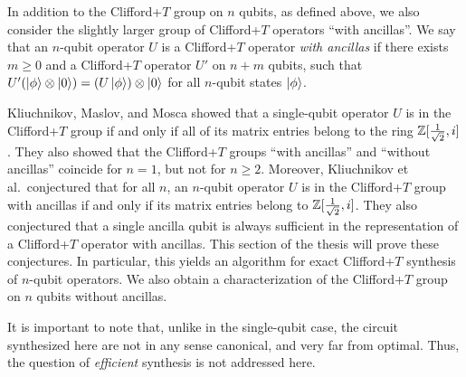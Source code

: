 In addition to the Clifford+$T$ group on $n$ qubits, as defined above, we also consider the
slightly larger group of Clifford+$T$ operators ``with ancillas''. We say that an $n$-qubit
operator $U$ is a Clifford+$T$ operator {\em with ancillas} if there exists $m\geq 0$ and a
Clifford+$T$ operator $U'$ on $n+m$ qubits, such that $U'(\left\vert{\phi}\right\rangle\otimes\left\vert{0}\right\rangle)=
(U\left\vert{\phi}\right\rangle)\otimes\left\vert{0}\right\rangle$ for all $n$-qubit states $\left\vert{\phi}\right\rangle$.

Kliuchnikov, Maslov, and Mosca {\cite{Kliuchnikov-et-al}} showed that a single-qubit operator $U$
is in the Clifford+$T$ group if and only if all of its matrix entries belong to the ring
$\mathbb{Z}[\frac1{\sqrt{2}},i]$. They also showed that the Clifford+$T$ groups ``with ancillas'' and
``without ancillas'' coincide for $n=1$, but not for $n\geq 2$. Moreover, Kliuchnikov et
al.~conjectured that for all $n$, an $n$-qubit operator $U$ is in the Clifford+$T$ group with
ancillas if and only if its matrix entries belong to $\mathbb{Z}[\frac1{\sqrt{2}},i]$. They also
conjectured that a single ancilla qubit is always sufficient in the representation of a
Clifford+$T$ operator with ancillas. This section of the thesis will prove these conjectures. In
particular, this yields an algorithm for exact Clifford+$T$ synthesis of $n$-qubit operators. We
also obtain a characterization of the Clifford+$T$ group on $n$ qubits without ancillas.

It is important to note that, unlike in the single-qubit case, the circuit synthesized here are not
in any sense canonical, and very far from optimal. Thus, the question of {\em efficient} synthesis
is not addressed here.

